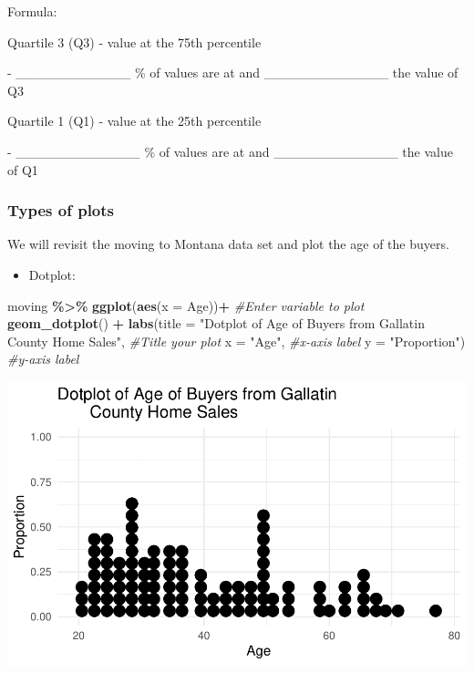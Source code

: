 \documentclass[
]{report}
\newenvironment{Shaded}{\begin{snugshade}}{\end{snugshade}}
\newcommand{\AttributeTok}[1]{\textcolor[rgb]{0.13,0.29,0.53}{#1}}
\newcommand{\CommentTok}[1]{\textcolor[rgb]{0.56,0.35,0.01}{\textit{#1}}}
\newcommand{\FunctionTok}[1]{\textcolor[rgb]{0.13,0.29,0.53}{\textbf{#1}}}
\newcommand{\NormalTok}[1]{#1}
\newcommand{\SpecialCharTok}[1]{\textcolor[rgb]{0.81,0.36,0.00}{\textbf{#1}}}
\newcommand{\StringTok}[1]{\textcolor[rgb]{0.31,0.60,0.02}{#1}}
\providecommand{\tightlist}{%
  \setlength{\itemsep}{0pt}\setlength{\parskip}{0pt}}
\newcommand{\rgi}{\hspace{24pt}}  %
\begin{document}
\rgi Formula:

\rgi \rgi Quartile 3 (Q3) - value at the 75th percentile

\rgi \rgi - \_\_\_\_\_\_\_\_\_\_\_\_ \% of values are at and \_\_\_\_\_\_\_\_\_\_\_\_\_ the value of Q3

\rgi \rgi Quartile 1 (Q1) - value at the 25th percentile

\rgi \rgi - \_\_\_\_\_\_\_\_\_\_\_\_\_ \% of values are at and \_\_\_\_\_\_\_\_\_\_\_\_\_ the value of Q1

\vspace{1mm}


\hypertarget{types-of-plots}{%
\subsubsection*{Types of plots}\label{types-of-plots}}

We will revisit the moving to Montana data set and plot the age of the buyers.

\begin{itemize}
\tightlist
\item
  Dotplot:
\end{itemize}

\vspace{0.5in}

\begin{Shaded}
\begin{Highlighting}[]
\NormalTok{moving }\SpecialCharTok{\%\textgreater{}\%}
  \FunctionTok{ggplot}\NormalTok{(}\FunctionTok{aes}\NormalTok{(}\AttributeTok{x =}\NormalTok{ Age))}\SpecialCharTok{+} \CommentTok{\#Enter variable to plot}
  \FunctionTok{geom\_dotplot}\NormalTok{() }\SpecialCharTok{+} 
  \FunctionTok{labs}\NormalTok{(}\AttributeTok{title =} \StringTok{"Dotplot of Age of Buyers from Gallatin }
\StringTok{       County Home Sales"}\NormalTok{, }\CommentTok{\#Title your plot}
       \AttributeTok{x =} \StringTok{"Age"}\NormalTok{, }\CommentTok{\#x{-}axis label}
       \AttributeTok{y =} \StringTok{"Proportion"}\NormalTok{) }\CommentTok{\#y{-}axis label}
\end{Highlighting}
\end{Shaded}

\begin{center}\includegraphics[width=0.75\linewidth]{03-LN03-EDA_files/figure-latex/unnamed-chunk-15-1} \end{center}
\end{document}
